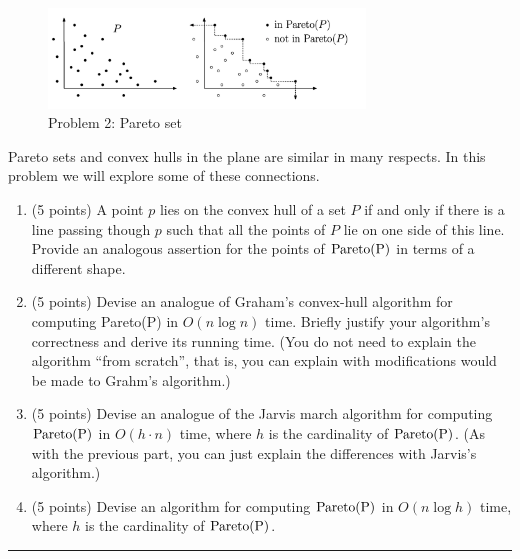 \documentclass[11pt]{article}
\newcommand{\pareto}[1]{\rm{Pareto}(#1)}
\begin{document}
\begin{figure}[h]
    \centering
    \includegraphics[width=0.75\textwidth]{pareto}
    \caption{Problem 2: Pareto set}
\end{figure}

Pareto sets and convex hulls in the plane are similar in many respects.  In
this problem we will explore some of these connections.

\begin{enumerate}

\item (5 points) A point $p$ lies on the convex hull of a set $P$ if and only if there is
a line passing though $p$ such that all the points of $P$ lie on one side of
this line.  Provide an analogous assertion for the points of $\pareto{P}$ in
terms of a different shape.

\item (5 points) Devise an analogue of Graham's convex-hull algorithm for computing
\pareto{P} in $O(n \log n)$ time.  Briefly justify your algorithm's correctness
and derive its running time.  (You do not need to explain the algorithm ``from
scratch'', that is, you can explain with modifications would be made to Grahm's
algorithm.)

\item (5 points) Devise an analogue of the Jarvis march algorithm for computing
$\pareto{P}$ in $O(h \cdot n)$ time, where $h$ is the cardinality of
$\pareto{P}$.  (As with the previous part, you can just explain the differences
with Jarvis's algorithm.)

\item (5 points) Devise an algorithm for computing $\pareto{P}$ in $O(n
\log h)$ time, where $h$ is the cardinality of $\pareto{P}$.

\end{enumerate}

\hrule
\end{document}
